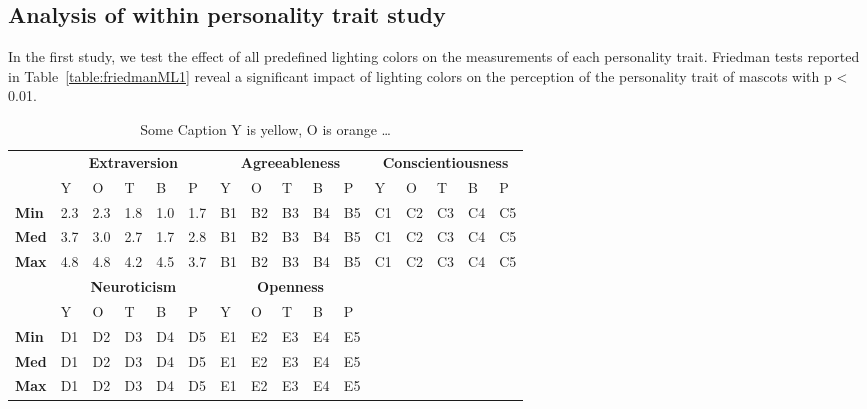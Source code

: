 \subsection{Analysis of within personality trait study}
\label{Study1(M-L)}
In the first study, we test the effect of all predefined lighting colors on the measurements of each personality trait.
Friedman tests reported in Table~\ref{table:friedmanML1} reveal a significant impact of lighting colors on the perception
of the personality trait of mascots with p < 0.01.

\begin{table}
\renewcommand{\arraystretch}{1.2}
\begin{center}
\begin{tabular}{p{}|
			p{0.025\textwidth}|p{}|p{}|p{}|p{}||
			p{}|p{}|p{}|p{}|p{}||
			p{}|p{}|p{}|p{}|p{}|}
\cline{2-16}
  & \multicolumn{5}{c||}{\textbf{Extraversion}} & \multicolumn{5}{c||}{\textbf{Agreeableness}} & \multicolumn{5}{c|}{\textbf{Conscientiousness}} \\
\cline{2-16}
 			& Y & O & T & B & P 			& Y & O & T & B & P  	 	& Y & O & T & B & P     \\
\cline{2-16}
\textbf{Min}  	& 2.3 & 2.3 & 1.8 & 1.0 & 1.7 		& B1 & B2 & B3 & B4 & B5  	& C1 & C2 & C3 & C4 & C5  \\

\textbf{Med} 	& 3.7 & 3.0 & 2.7 & 1.7 & 2.8 		& B1 & B2 & B3 & B4 & B5  	& C1 & C2 & C3 & C4 & C5  \\

\textbf{Max}	& 4.8 & 4.8 & 4.2 & 4.5 & 3.7 		& B1 & B2 & B3 & B4 & B5  	& C1 & C2 & C3 & C4 & C5 \\
\cline{2-16}

\cline{2-11}
&  \multicolumn{5}{|c||}{\textbf{Neuroticism}} & \multicolumn{5}{|c||}{\textbf{Openness}} \\
\cline{2-11}
				& Y & O & T & B & P 			& Y & O & T & B & P    		\\
\cline{2-11}
	\textbf{Min} 	& D1 & D2 & D3 & D4 & D5 		& E1 & E2 & E3 & E4 & E5 	\\

	\textbf{Med}  & D1 & D2 & D3 & D4 & D5 		& E1 & E2 & E3 & E4 & E5 	\\

	\textbf{Max}  	& D1 & D2 & D3 & D4 & D5 		& E1 & E2 & E3 & E4 & E5  	\\
\cline{2-11}

\end{tabular}
\end{center}
\caption{Some Caption Y is yellow, O is orange \ldots}
\label{table:e-c}
\end{table}


